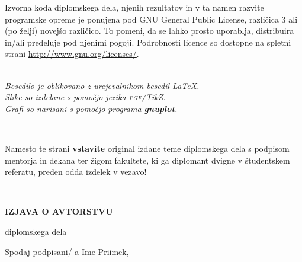 \documentclass[12pt,a4paper]{book}
\newcommand{\gnuplot}{\textbf{gnuplot}}
\newcommand{\pgfname}{\textsc{pgf}}
\newcommand{\tikzname}{Ti\emph{k}Z}
\begin{document}
\vspace*{1.5cm}
{\small \noindent
Izvorna koda diplomskega dela, njenih rezultatov in v ta namen razvite programske opreme je ponujena pod GNU General Public License,
različica 3 ali (po želji) novejšo različico. To pomeni, da se lahko prosto uporablja, distribuira in/ali predeluje pod njenimi pogoji.
Podrobnosti licence so dostopne na spletni strani \url{http://www.gnu.org/licenses/}.
}

\begin{center} 
\ \\ \vfill
{\em
Besedilo je oblikovano z urejevalnikom besedil \LaTeX. \\ Slike so izdelane s pomočjo jezika \pgfname/\tikzname. \\ Grafi so narisani
s pomočjo programa \gnuplot.}
\end{center}

\newpage

\ \thispagestyle{empty}

\newpage


\thispagestyle{empty}

Namesto te strani {\bf vstavite} original izdane teme diplomskega dela s podpisom mentorja in dekana ter \v zigom fakultete, ki ga diplomant
dvigne v študent\-skem referatu,  preden odda izdelek v vezavo!

\newpage


\ \thispagestyle{empty}

\newpage



\thispagestyle{empty}

\vspace{1cm}
\begin{center} 
{\Large \textbf{IZJAVA O AVTORSTVU}}
\end{center}

\begin{center} 
{\Large diplomskega dela}
\end{center}

\vspace{1cm}
Spodaj podpisani/-a \hspace{0.5cm} Ime Priimek,
\end{document}
